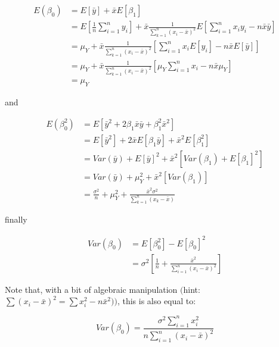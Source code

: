 \documentclass[11pt]{article}
\begin{document}
\begin{equation}
\begin{split}
E(\beta_0) &= E[\bar{y}] + \bar{x}E[\beta_1]\\
&= E[\frac{1}{n} \sum_{i=1}^n y_i] + \bar{x}\frac{1}{\sum_{k=1}^n (x_i - \bar{x})^2}E[\sum_{i=1}^n x_i y_i - n\bar{x}\bar{y}]\\
&= \mu_Y + \bar{x}\frac{1}{\sum_{k=1}^n (x_i - \bar{x})^2}[\sum_{i=1}^n x_i E[y_i] - n\bar{x}E[\bar{y}]]\\
&= \mu_Y + \bar{x}\frac{1}{\sum_{k=1}^n (x_i - \bar{x})^2}[\mu_Y \sum_{i=1}^n x_i - n\bar{x}\mu_Y]\\
&= \mu_Y
\end{split}
\end{equation}

and

\begin{equation}
\begin{split}
E(\beta_0^2) &= E[\bar{y}^2 + 2 \beta_1 \bar{x} \bar{y} + \beta_1^2 \bar{x}^2]\\
&= E[\bar{y}^2] + 2 \bar{x} E[\beta_1 \bar{y}] + \bar{x}^2 E[\beta_1^2]\\
&= Var(\bar{y}) + E[\bar{y}]^2 + \bar{x}^2 \left[ Var(\beta_1) + E[\beta_1]^2  \right]\\
&= Var(\bar{y}) + \mu_Y^2 + \bar{x}^2 \left[ Var(\beta_1) \right]\\
&= \frac{\sigma^2}{n} + \mu_Y^2 + \frac{\bar{x}^2 \sigma^2}{\sum_{k=1}^n (x_k - \bar{x})}
\end{split}
\end{equation}

finally

\begin{equation}
\begin{split}
Var(\beta_0) &= E[\beta_0^2] - E[\beta_0]^2\\
&= \sigma^{2}\left[ \frac{1}{n} + \frac{\bar{x}^{2}}{\sum_{i=1}^{n}(x_{i}-\bar{x})^{2}}  \right]
\end{split}
\end{equation}

Note that, with a bit of algebraic manipulation \(\big(\)hint:
\(\sum(x_{i}-\bar{x})^{2}=\sum x_{i}^{2}-n\bar{x}^{2})\)\(\big)\), this
is also equal to:

\[Var(\beta_{0}) = \frac{\sigma^{2}\sum_{i=1}^{n}x_{i}^{2}}{n\sum_{i=1}^{n}\left(x_{i}-\bar{x}\right)^{2} } \]


    
    
    
    
\end{document}
